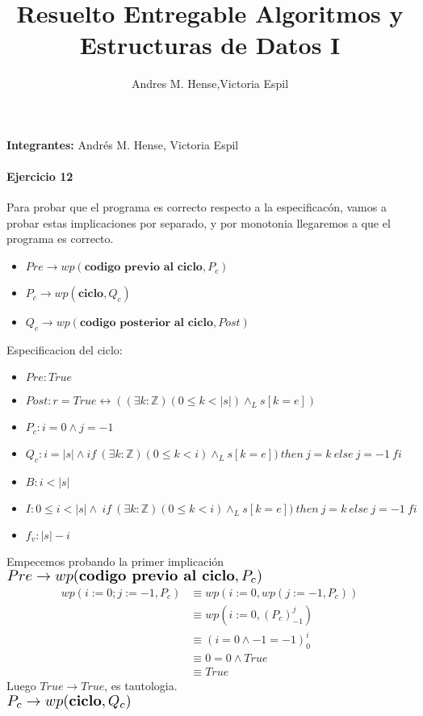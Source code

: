 \documentclass[a4paper]{article}
\title{Resuelto Entregable Algoritmos y Estructuras de Datos I}
\author{Andres M. Hense,Victoria Espil}
\date{}
\begin{document}




\begin{center}
\textbf{Integrantes:} Andrés M. Hense, Victoria Espil
\end{center}

\paragraph{Ejercicio 12}
Para probar que el programa es correcto respecto a la especificacón, vamos a probar estas implicaciones
 por separado, y por monotonia llegaremos a que el programa es correcto.\\
\begin{itemize}
\item $Pre \rightarrow wp(\textbf{codigo previo al ciclo},P_c)$
\item $P_c \rightarrow wp(\textbf{ciclo},Q_c)$
\item $Q_c \rightarrow wp(\textbf{codigo posterior al ciclo},Post)$
\end{itemize}
 Especificacion del ciclo:
	\begin{itemize}
		\item $Pre: True$
		\item $Post: r=True \leftrightarrow ((\exists k:\mathbb{Z})(0\leq k<|s|)\wedge_L s[k=e]) $
		\item $P_c: i=0\wedge j=-1$
		\item $Q_c: i=|s|\wedge if\ (\exists k:\mathbb{Z})(0\leq k<i)\wedge_L s[k=e])\ then\ j=k\ else\ j=-1\ fi$
		\item $B: i<|s|$
		\item $I: 0\leq i<|s|\wedge\ if\ (\exists k:\mathbb{Z})(0\leq k<i)\wedge_L s[k=e])\ then\ j=k\ else\ j=-1\ fi$
		\item $f_v:|s|-i$
	\end{itemize}
Empecemos probando la primer implicación\\
$\scalebox{1.3}{$Pre\rightarrow wp(\textbf{codigo previo al ciclo},P_c)$}$\medskip \\
\begin{align*}
wp(i:=0; j:=-1,P_c)&\equiv wp(i:=0,wp(j:=-1,P_c))\\
&\equiv wp(i:=0,(P_c)_{-1}^{j})\\
&\equiv (i=0\wedge -1=-1)_{0}^{i}\\
&\equiv 0=0\wedge True\\
&\equiv True
\end{align*}
Luego $True\rightarrow True$, es tautologia.\medskip\\
$\scalebox{1.3}{$P_c \rightarrow wp(\textbf{ciclo},Q_c)$}$\medskip \\
\end{document}
